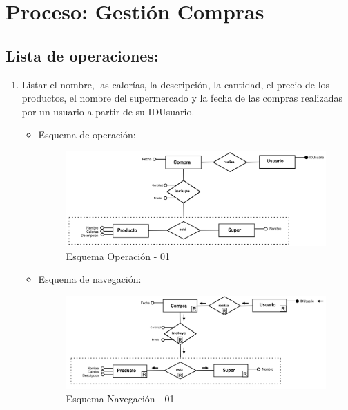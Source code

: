 \documentclass[a4paper,12pt]{report}
\begin{document}
\section{Proceso: Gestión Compras}
\label{sec-7-1}
\subsection{Lista de operaciones:}
\label{sec-7-1-1}
\begin{enumerate}
\item Listar el nombre, las calorías, la descripción, la cantidad, el precio de los productos, el nombre del supermercado y la fecha de las compras realizadas por un usuario a partir de su IDUsuario.
\begin{itemize}
\item Esquema de operación:
\begin{figure}[!htp]
\centering
\includegraphics[width=0.9\linewidth]{./operaciones/img/Compras/01_ope.png}
\caption{Esquema Operación - 01}
\label{fig:ope01}
\medskip
\footnotesize
{}
\end{figure}
\item Esquema de navegación:
\begin{figure}[!htp]
\centering
\includegraphics[width=0.9\linewidth]{./operaciones/img/Compras/01_nav.png}
\caption{Esquema Navegación - 01}
\label{fig:nave01}
\medskip
\footnotesize
{}
\end{figure}
\end{itemize}


\end{enumerate}
\end{document}
